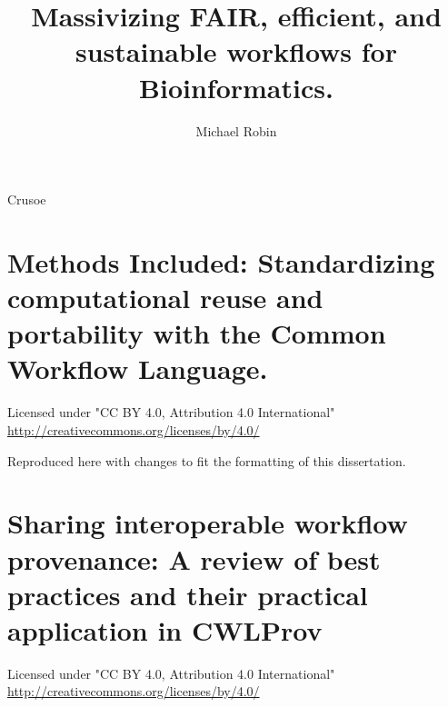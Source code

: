 \documentclass{dissertation}
\begin{document}
\title{Massivizing {FAIR,} {efficient,} and sustainable workflows for Bioinformatics.}
\author{Michael Robin}{Crusoe}

\frontmatter




\setcounter{tocdepth}{1}
\tableofcontents




\mainmatter

\thumbtrue

\nobibliography*



\chapter{Methods Included: Standardizing computational reuse and portability with the Common Workflow Language.}
\label{methods-included}


Licensed under "CC BY 4.0, Attribution 4.0 International" \url{http://creativecommons.org/licenses/by/4.0/}

Reproduced here with changes to fit the formatting of this dissertation.




\chapter{Sharing interoperable workflow provenance: A review of best practices and their practical application in CWLProv}
\label{cwlprov}

Licensed under "CC BY 4.0, Attribution 4.0 International" \url{http://creativecommons.org/licenses/by/4.0/}
\end{document}
